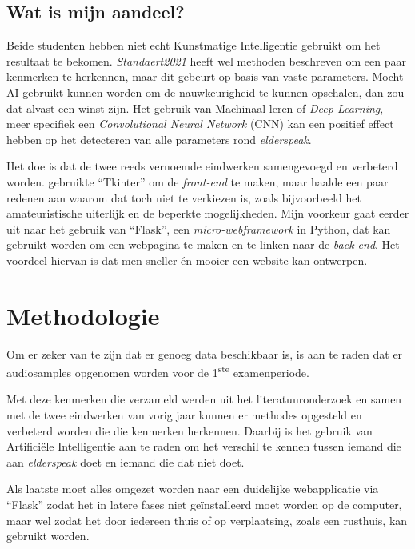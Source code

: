 \subsection{Wat is mijn aandeel?}\label{subsec:watismijnadeel}

Beide studenten hebben niet echt Kunstmatige Intelligentie gebruikt om het resultaat te bekomen. \textit{Standaert2021} heeft wel methoden beschreven om een paar kenmerken te herkennen, maar dit gebeurt op basis van vaste parameters.
Mocht AI gebruikt kunnen worden om de nauwkeurigheid te kunnen opschalen, dan zou dat alvast een winst zijn.
Het gebruik van Machinaal leren of \textit{Deep Learning}, meer specifiek een \textit{Convolutional Neural Network} (CNN) kan een positief effect hebben op het detecteren van alle parameters rond \textit{elderspeak}.

Het doe is dat de twee reeds vernoemde eindwerken samengevoegd en verbeterd worden. \textcite{Beeckman2021} gebruikte ``Tkinter'' om de \textit{front-end} te maken, maar haalde een paar redenen aan waarom dat toch niet te verkiezen is, zoals bijvoorbeeld het amateuristische uiterlijk en de beperkte mogelijkheden.
Mijn voorkeur gaat eerder uit naar het gebruik van ``Flask'', een \textit{micro-webframework} in Python, dat kan gebruikt worden om een webpagina te maken en te linken naar de \textit{back-end}.
Het voordeel hiervan is dat men sneller én mooier een website kan ontwerpen.


\section{Methodologie}
\label{sec:methodologie}

Om er zeker van te zijn dat er genoeg data beschikbaar is, is aan te raden dat er audiosamples opgenomen worden voor de 1\textsuperscript{ste} examenperiode.

Met deze kenmerken die verzameld werden uit het literatuuronderzoek en samen met de twee eindwerken van vorig jaar kunnen er methodes opgesteld en verbeterd worden die die kenmerken herkennen.
Daarbij is het gebruik van Artificiële Intelligentie aan te raden om het verschil te kennen tussen iemand die aan \textit{elderspeak} doet en iemand die dat niet doet.

Als laatste moet alles omgezet worden naar een duidelijke webapplicatie via ``Flask'' zodat het in latere fases niet geïnstalleerd moet worden op de computer, maar wel zodat het door iedereen thuis of op verplaatsing, zoals een rusthuis, kan gebruikt worden.



